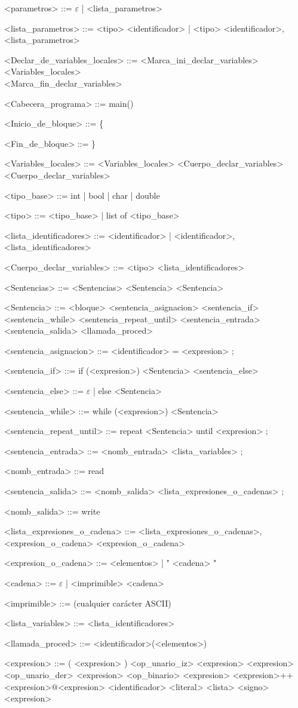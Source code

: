 \documentclass{scrartcl}
\begin{document}
\begin{grammar}
<parametros> ::= $\varepsilon$ | <lista_parametros>

<lista_parametros> ::= <tipo> <identificador> | <tipo> <identificador>, <lista_parametros>

<Declar_de_variables_locales> ::= <Marca_ini_declar_variables> \\
<Variables_locales> \\
<Marca_fin_declar_variables>

<Cabecera_programa> ::= main()

<Inicio_de_bloque> ::= \{

<Fin_de_bloque> ::= \}

<Variables_locales> ::= <Variables_locales> <Cuerpo_declar_variables>
\alt <Cuerpo_declar_variables>

<tipo_base> ::= int | bool | char | double

<tipo> ::= <tipo_base> | list of <tipo_base>

<lista_identificadores> ::= <identificador> | <identificador>, <lista_identificadores>

<Cuerpo_declar_variables> ::= <tipo> <lista_identificadores>

<Sentencias> ::= <Sentencias> <Sentencia>
\alt <Sentencia>

<Sentencia> ::= <bloque>
\alt <sentencia_asignacion>
\alt <sentencia_if>
\alt <sentencia_while>
\alt <sentencia_repeat_until>
\alt <sentencia_entrada>
\alt <sentencia_salida>
\alt <llamada_proced>

<sentencia_asignacion> ::=  <identificador> = <expresion> ;

<sentencia_if> ::= if (<expresion>) <Sentencia> <sentencia_else>

<sentencia_else> ::= $\varepsilon$ | else <Sentencia>

<sentencia_while> ::= while (<expresion>) <Sentencia>

<sentencia_repeat_until> ::= repeat <Sentencia> until <expresion> ;

<sentencia_entrada> ::= <nomb_entrada> <lista_variables> ;

<nomb_entrada> ::= read

<sentencia_salida> ::= <nomb_salida> <lista_expresiones_o_cadenas> ;

<nomb_salida> ::= write

<lista_expresiones_o_cadena> ::= <lista_expresiones_o_cadenas>, <expresion_o_cadena>
\alt <expresion_o_cadena>

<expresion_o_cadena> ::= <elementos> | " <cadena> "

<cadena> ::= $\varepsilon$ | <imprimible> <cadena>

<imprimible> ::= (cualquier carácter ASCII)

<lista_variables> ::= <lista_identificadores>

<llamada_proced> ::= <identificador>(<elementos>)

<expresion> ::= ( <expresion> )
\alt <op_unario_iz> <expresion>
\alt <expresion> <op_unario_der>
\alt <expresion> <op_binario> <expresion>
\alt <expresion>++<expresion>@<expresion>
\alt <identificador>
\alt <literal>
\alt <lista>
\alt <signo> <expresion>

\end{grammar}
\end{document}
